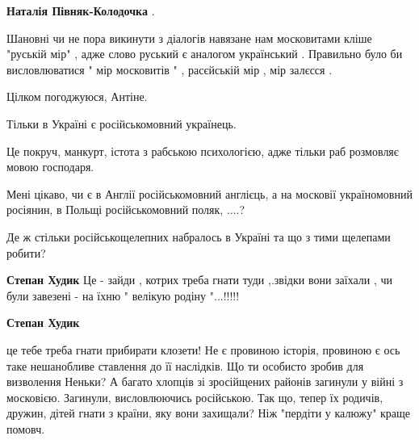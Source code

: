 \begin{itemize}
\begin{itemize}
\textbf{Наталія Півняк-Колодочка} . 

Шановні чи не пора викинути з діалогів навязане нам московитами кліше "руській
мір" , адже слово руський є аналогом український . Правильно було би
висловлюватися " мір московитів " , расєйській мір , мір залєсся .

\end{itemize}

 
Цілком погоджуюся, Антіне.

 

Тільки в Україні є російськомовний українець.

Це покруч, манкурт, істота з рабською психологією, адже тільки раб розмовляє
мовою господаря.

Мені цікаво, чи є в Англії російськомовний англієць, а на московії
україномовний росіянин, в Польщі російськомовний поляк, ....?

Де ж стільки російськощелепних набралось в Україні та що з тими щелепами
робити?

\begin{itemize}
 
\textbf{Степан Худик}
Це - зайди , котрих треба гнати туди ,.звідки вони заїхали , чи були завезені - на їхню " велікую родіну "...!!!!!

 
\textbf{Степан Худик} 

це тебе треба гнати прибирати клозети! Не є провиною історія, провиною є ось
таке нешанобливе ставлення до її наслідків. Що ти особисто зробив для
визволення Неньки? А багато хлопців зі зросійщених районів загинули у війні з
московією. Загинули, висловлюючись російською. Так що, тепер їх родичів,
дружин, дітей гнати з країни, яку вони захищали? Ніж "пердіти у калюжу" краще
помовч.



\end{itemize}
\end{itemize}
